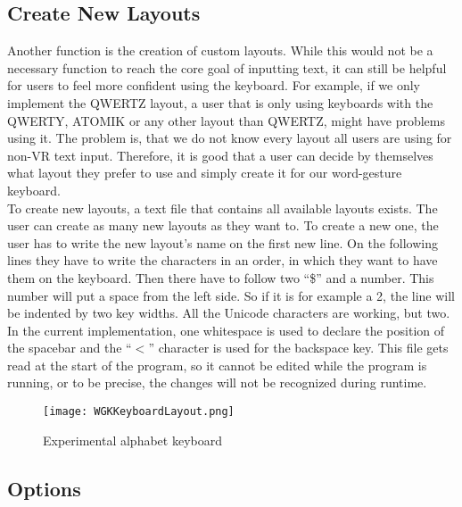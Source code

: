 \subsection{Create New Layouts}
Another function is the creation of custom layouts. While this would not be a necessary function to reach the core goal of inputting text, it can still be helpful for users to feel more confident using the keyboard. For example, if we only implement the QWERTZ layout, a user that is only using keyboards with the QWERTY, ATOMIK or any other layout than QWERTZ, might have problems using it. The problem is, that we do not know every layout all users are using for non-VR text input. Therefore, it is good that a user can decide by themselves what layout they prefer to use and simply create it for our word-gesture keyboard.\\
To create new layouts, a text file that contains all available layouts exists. The user can create as many new layouts as they want to. To create a new one, the user has to write the new layout's name on the first new line. On the following lines they have to write the characters in an order, in which they want to have them on the keyboard. Then there have to follow two ``\$'' and a number. This number will put a space from the left side. So if it is for example a 2, the line will be indented by two key widths. All the Unicode characters are working, but two. In the current implementation, one whitespace is used to declare the position of the spacebar and the ``$<$'' character is used for the backspace key. This file gets read at the start of the program, so it cannot be edited while the program is running, or to be precise, the changes will not be recognized during runtime. 
\begin{figure}[H]
    \centering
    \texttt{[image: WGKKeyboardLayout.png]}
    \caption{Experimental alphabet keyboard}
    \label{fig:WGKLayout}
\end{figure}

\subsection{Options}

